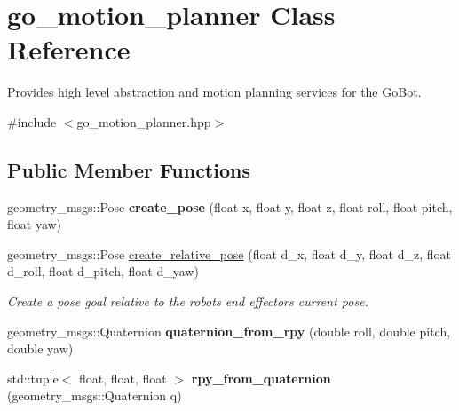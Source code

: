 \hypertarget{classgo__motion__planner}{}\section{go\+\_\+motion\+\_\+planner Class Reference}
\label{classgo__motion__planner}


Provides high level abstraction and motion planning services for the Go\+Bot.  




{\ttfamily \#include $<$go\+\_\+motion\+\_\+planner.\+hpp$>$}

\subsection*{Public Member Functions}
\begin{DoxyCompactItemize}
\item 
\mbox{\label{classgo__motion__planner_a74e2e97851998d7f6b8c29f31e0adfb0}} 
geometry\+\_\+msgs\+::\+Pose {\bfseries create\+\_\+pose} (float x, float y, float z, float roll, float pitch, float yaw)
\item 
\mbox{\label{classgo__motion__planner_a70e5bea73ba3ec12f0d91d107c58dec1}} 
geometry\+\_\+msgs\+::\+Pose \hyperlink{classgo__motion__planner_a70e5bea73ba3ec12f0d91d107c58dec1}{create\+\_\+relative\+\_\+pose} (float d\+\_\+x, float d\+\_\+y, float d\+\_\+z, float d\+\_\+roll, float d\+\_\+pitch, float d\+\_\+yaw)
\begin{DoxyCompactList}\small\item\em Create a pose goal relative to the robot\textquotesingle{}s end effector\textquotesingle{}s current pose. \end{DoxyCompactList}\item 
\mbox{\label{classgo__motion__planner_a60dfb0301a459aad73f0e597ef773ef3}} 
geometry\+\_\+msgs\+::\+Quaternion {\bfseries quaternion\+\_\+from\+\_\+rpy} (double roll, double pitch, double yaw)
\item 
\mbox{\label{classgo__motion__planner_ab4b74ceb1ce2cab6859d8f7f0f32caa5}} 
std\+::tuple$<$ float, float, float $>$ {\bfseries rpy\+\_\+from\+\_\+quaternion} (geometry\+\_\+msgs\+::\+Quaternion q)
\item 

\end{DoxyCompactItemize}
